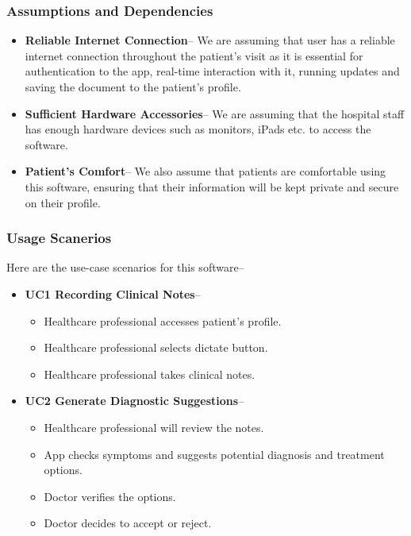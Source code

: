 \documentclass[12pt]{article}
\begin{document}
\subsubsection{Assumptions and Dependencies} \label{sec_assumpt}

\begin{itemize}
  \item\textbf{Reliable Internet Connection}-- We are assuming that user has a reliable internet connection throughout the patient’s visit as it is essential for authentication to the app, real-time interaction with it, running updates and saving the document to the patient’s profile.
  \item\textbf{Sufficient Hardware Accessories}-- We are assuming that the hospital staff has enough hardware devices such as monitors, iPads etc. to access the software.
  \item\textbf{Patient’s Comfort}-- We also assume that patients are comfortable using this software, ensuring that their information will be kept private and secure on their profile.
\end{itemize}

\subsubsection{Usage Scanerios}

Here are the use-case scenarios for this software--

\begin{itemize}
  \item\textbf{UC1 Recording Clinical Notes}--
  \begin{itemize}
    \item{Healthcare professional accesses patient’s profile.}
    \item{Healthcare professional selects dictate button.}
    \item{Healthcare professional takes clinical notes.}
  \end{itemize}
  \item\textbf{UC2 Generate Diagnostic Suggestions}--
  \begin{itemize}
    \item{Healthcare professional will review the notes.}
    \item{App checks symptoms and suggests potential diagnosis and treatment options.}
    \item{Doctor verifies the options.}
    \item{Doctor decides to accept or reject.}
  \end{itemize}
\end{itemize}
\end{document}
